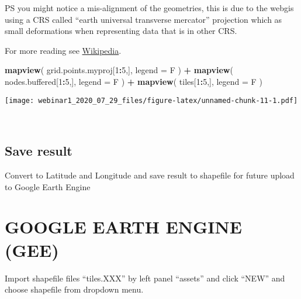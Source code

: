\documentclass[]{article}
\newenvironment{Shaded}{\begin{snugshade}}{\end{snugshade}}
\newcommand{\DataTypeTok}[1]{\textcolor[rgb]{0.13,0.29,0.53}{#1}}
\newcommand{\DecValTok}[1]{\textcolor[rgb]{0.00,0.00,0.81}{#1}}
\newcommand{\KeywordTok}[1]{\textcolor[rgb]{0.13,0.29,0.53}{\textbf{#1}}}
\newcommand{\NormalTok}[1]{#1}
\newcommand{\OperatorTok}[1]{\textcolor[rgb]{0.81,0.36,0.00}{\textbf{#1}}}
\newcommand{\StringTok}[1]{\textcolor[rgb]{0.31,0.60,0.02}{#1}}
\begin{document}
PS you might notice a mis-alignment of the geometries, this is due to
the webgis using a CRS called ``earth universal transverse mercator''
projection which as small deformations when representing data that is in
other CRS.

For more reading see
\href{https://en.wikipedia.org/wiki/Mercator_projection}{Wikipedia}.

\begin{Shaded}
\begin{Highlighting}[]
\KeywordTok{mapview}\NormalTok{( grid.points.myproj[}\DecValTok{1}\OperatorTok{:}\DecValTok{5}\NormalTok{,], }\DataTypeTok{legend =}\NormalTok{ F ) }\OperatorTok{+}\StringTok{ }\KeywordTok{mapview}\NormalTok{( nodes.buffered[}\DecValTok{1}\OperatorTok{:}\DecValTok{5}\NormalTok{,], }\DataTypeTok{legend =}\NormalTok{ F  )  }\OperatorTok{+}\StringTok{ }\KeywordTok{mapview}\NormalTok{( tiles[}\DecValTok{1}\OperatorTok{:}\DecValTok{5}\NormalTok{,], }\DataTypeTok{legend =}\NormalTok{ F  )}
\end{Highlighting}
\end{Shaded}

\texttt{[image: webinar1\_2020\_07\_29\_files/figure-latex/unnamed-chunk-11-1.pdf]}

~

\hypertarget{save-result}{%
\subsection{Save result}\label{save-result}}

Convert to Latitude and Longitude and save result to shapefile for
future upload to Google Earth Engine

\begin{Shaded}
\end{Shaded}

\hypertarget{google-earth-engine-gee}{%
\section{GOOGLE EARTH ENGINE (GEE)}\label{google-earth-engine-gee}}

Import shapefile files ``tiles.XXX'' by left panel ``assets'' and click
``NEW'' and choose shapefile from dropdown menu.
\end{document}

